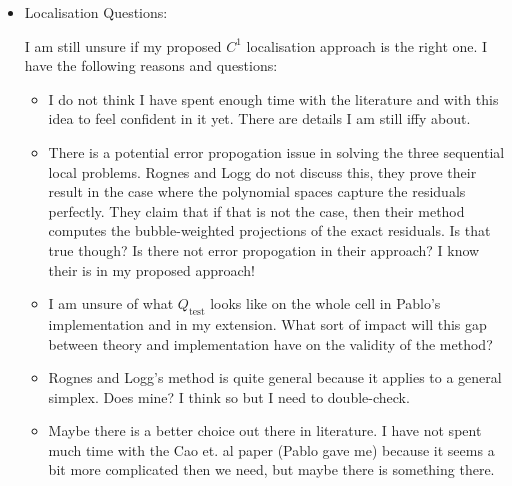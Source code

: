\documentclass[12pt,a4paper]{article}
\begin{document}
\begin{itemize}
    \item Localisation Questions:
    
    I am still unsure if my proposed $C^1$ localisation approach is the right one. I have the following reasons and questions:
    \begin{itemize}
    \setlength{\itemsep}{0.5em}
        \item I do not think I have spent enough time with the literature and with this idea to feel confident in it yet. There are details I am still iffy about. 
        
        \item  There is a potential error propogation issue in solving the three sequential local problems. Rognes and Logg do not discuss this, they prove their result in the case where the polynomial spaces capture the residuals perfectly. They claim that if that is not the case, then their method computes the bubble-weighted projections of the exact residuals. Is that true though? Is there not error propogation in their approach? I know their is in my proposed approach! 
        \item I am unsure of what $Q_{\text{test}}$ looks like on the whole cell in Pablo's implementation and in my extension. What sort of impact will this gap between theory and implementation have on the validity of the method? 
        \item Rognes and Logg's method is quite general because it applies to a general simplex. Does mine? I think so but I need to double-check. 
        \item Maybe there is a better choice out there in literature. I have not spent much time with the Cao et. al paper (Pablo gave me) because it seems a bit more complicated then we need, but maybe there is something there. 
    \end{itemize}


\end{itemize}
\end{document}
